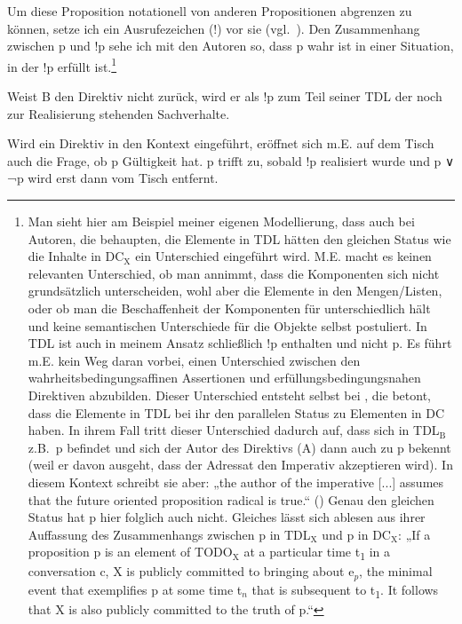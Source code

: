 Um diese Proposition notationell von anderen Propositionen abgrenzen zu können, setze ich ein Ausrufezeichen (!) vor sie (vgl.\ \citealt[54--55, 59 Fn 27]{Beyssade2006}). Den Zusammenhang zwischen p und !p sehe ich mit den Autoren so, dass p wahr ist in einer Situation, in der !p erfüllt ist.\footnote{\label{Fn7}Man sieht hier am Beispiel meiner eigenen Modellierung, dass auch bei Autoren, die behaupten, die Elemente in TDL hätten den gleichen Status wie die Inhalte in $\textrm{DC}_{\textrm{X}}$  ein Unterschied eingeführt wird. M.E. macht es keinen relevanten Unterschied, ob man annimmt, dass die Komponenten sich nicht grundsätzlich unterscheiden, wohl aber die Elemente in den Mengen/Listen, oder ob man die Beschaffenheit der Komponenten für unterschiedlich hält und keine semantischen Unterschiede für die Objekte selbst postuliert. In TDL ist auch in meinem Ansatz schließlich !p enthalten und nicht p. Es führt m.E. kein Weg daran vorbei, einen Unterschied zwischen den wahrheitsbedingungsaffinen Assertionen und erfüllungsbedingungsnahen Direktiven abzubilden. Dieser Unterschied entsteht selbst bei \citet[323]{Farkas2011}, die betont, dass die Elemente in TDL bei ihr den parallelen Status zu Elementen in DC haben. In ihrem Fall tritt dieser Unterschied dadurch auf, dass sich in TDL$_{\textrm{B}}$ z.B.\ p befindet und sich der Autor des Direktivs (A) dann auch zu p bekennt (weil er davon ausgeht, dass der Adressat den Imperativ akzeptieren wird). In diesem Kontext schreibt sie aber: „the author of the imperative [...] assumes that the future oriented proposition radical is true.“  (\citeyear[324]{Farkas2011}) Genau den gleichen Status hat p hier folglich auch nicht. Gleiches lässt sich ablesen aus ihrer Auffassung des Zusammenhangs zwischen p in TDL$_{\textrm{X}}$ und p in DC$_{\textrm{X}}$:  „If a proposition p is an element of TODO$_{\textrm{X}}$ at a particular time t\textsubscript{1} in a conversation c, X is publicly committed to bringing about e$_{p}$, the minimal event that exemplifies p at some time t$_{n}$ that is subsequent to t\textsubscript{1}. It follows that X is also publicly committed to the truth of p.“ }

Weist B den Direktiv nicht zurück, wird er als !p zum Teil seiner TDL der noch zur Realisierung stehenden Sachverhalte.

Wird ein Direktiv in den Kontext eingeführt, eröffnet sich m.E. auf dem Tisch auch die Frage, ob p Gültigkeit hat. p trifft zu, sobald !p realisiert wurde und p ∨ ¬p wird erst dann vom Tisch entfernt.

